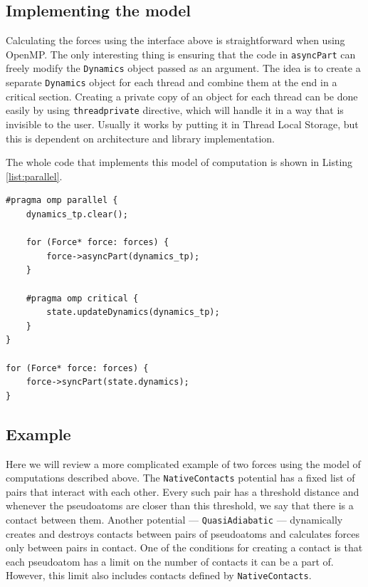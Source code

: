 \subsection{Implementing the model}\label{new:impl_model}

Calculating the forces using the interface above is straightforward when using OpenMP. The only interesting thing is ensuring that the code in \texttt{asyncPart} can freely modify the \texttt{Dynamics} object passed as an argument. The idea is to create a separate \texttt{Dynamics} object for each thread and combine them at the end in a critical section. Creating a private copy of an object for each thread can be done easily by using \texttt{threadprivate} directive, which will handle it in a way that is invisible to the user. Usually it works by putting it in Thread Local Storage, but this is dependent on architecture and library implementation. 

The whole code that implements this model of computation is shown in Listing \ref{list:parallel}.

\begin{lstlisting}[caption=Implementation of the described computation model]
#pragma omp parallel {
    dynamics_tp.clear();
        
    for (Force* force: forces) {
        force->asyncPart(dynamics_tp);
    }
    
    #pragma omp critical {
        state.updateDynamics(dynamics_tp);
    }
}

for (Force* force: forces) {
    force->syncPart(state.dynamics);
}
\end{lstlisting}\label{list:parallel}

\subsection{Example}\label{new:example}
Here we will review a more complicated example of two forces using the model of computations described above. The \texttt{NativeContacts} potential has a fixed list of pairs that interact with each other. Every such pair has a threshold distance and whenever the pseudoatoms are closer than this threshold, we say that there is a contact between them. Another potential --- \texttt{QuasiAdiabatic} --- dynamically creates and destroys contacts between pairs of pseudoatoms and calculates forces only between pairs in contact. One of the conditions for creating a contact is that each pseudoatom has a limit on the number of contacts it can be a part of. However, this limit also includes contacts defined by \texttt{NativeContacts}. 

